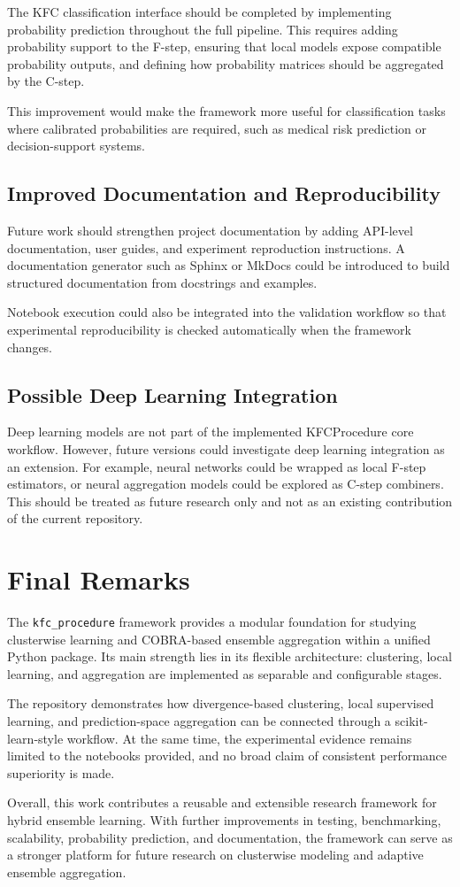 The KFC classification interface should be completed by implementing probability prediction throughout the full pipeline. This requires adding probability support to the F-step, ensuring that local models expose compatible probability outputs, and defining how probability matrices should be aggregated by the C-step.

This improvement would make the framework more useful for classification tasks where calibrated probabilities are required, such as medical risk prediction or decision-support systems.

\subsection{Improved Documentation and Reproducibility}

Future work should strengthen project documentation by adding API-level documentation, user guides, and experiment reproduction instructions. A documentation generator such as Sphinx or MkDocs could be introduced to build structured documentation from docstrings and examples.

Notebook execution could also be integrated into the validation workflow so that experimental reproducibility is checked automatically when the framework changes.

\subsection{Possible Deep Learning Integration}

Deep learning models are not part of the implemented KFCProcedure core workflow. However, future versions could investigate deep learning integration as an extension. For example, neural networks could be wrapped as local F-step estimators, or neural aggregation models could be explored as C-step combiners. This should be treated as future research only and not as an existing contribution of the current repository.

\section{Final Remarks}
\label{sec:final_remarks}

The \texttt{kfc\_procedure} framework provides a modular foundation for studying clusterwise learning and COBRA-based ensemble aggregation within a unified Python package. Its main strength lies in its flexible architecture: clustering, local learning, and aggregation are implemented as separable and configurable stages.

The repository demonstrates how divergence-based clustering, local supervised learning, and prediction-space aggregation can be connected through a scikit-learn-style workflow. At the same time, the experimental evidence remains limited to the notebooks provided, and no broad claim of consistent performance superiority is made.

Overall, this work contributes a reusable and extensible research framework for hybrid ensemble learning. With further improvements in testing, benchmarking, scalability, probability prediction, and documentation, the framework can serve as a stronger platform for future research on clusterwise modeling and adaptive ensemble aggregation.
